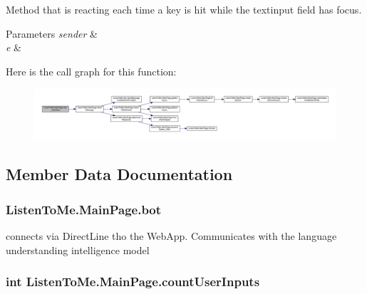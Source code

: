 Method that is reacting each time a key is hit while the textinput field has focus. 


\begin{DoxyParams}{Parameters}
{\em sender} & \\
\hline
{\em e} & \\
\hline
\end{DoxyParams}


Here is the call graph for this function\+:
\nopagebreak
\begin{figure}[H]
\begin{center}
\leavevmode
\includegraphics[width=350pt]{class_listen_to_me_1_1_main_page_a2b101dc0c72c1dcb73fe756a5847940e_cgraph}
\end{center}
\end{figure}




\subsection{Member Data Documentation}
\subsubsection[{\texorpdfstring{bot}{bot}}]{ Listen\+To\+Me.\+Main\+Page.\+bot\hspace{0.3cm}{\ttfamily [private]}}\hypertarget{class_listen_to_me_1_1_main_page_a09b9deff7e80e3d524cd0f12d1c060f9}{}\label{class_listen_to_me_1_1_main_page_a09b9deff7e80e3d524cd0f12d1c060f9}


connects via Direct\+Line tho the Web\+App. Communicates with the language understanding intelligence model 

\subsubsection[{\texorpdfstring{count\+User\+Inputs}{countUserInputs}}]{\setlength{\rightskip}{0pt plus 5cm}int Listen\+To\+Me.\+Main\+Page.\+count\+User\+Inputs\hspace{0.3cm}{\ttfamily [private]}}\hypertarget{class_listen_to_me_1_1_main_page_a94ae31ea5ea90fff0194c7c3345e3987}{}\label{class_listen_to_me_1_1_main_page_a94ae31ea5ea90fff0194c7c3345e3987}


